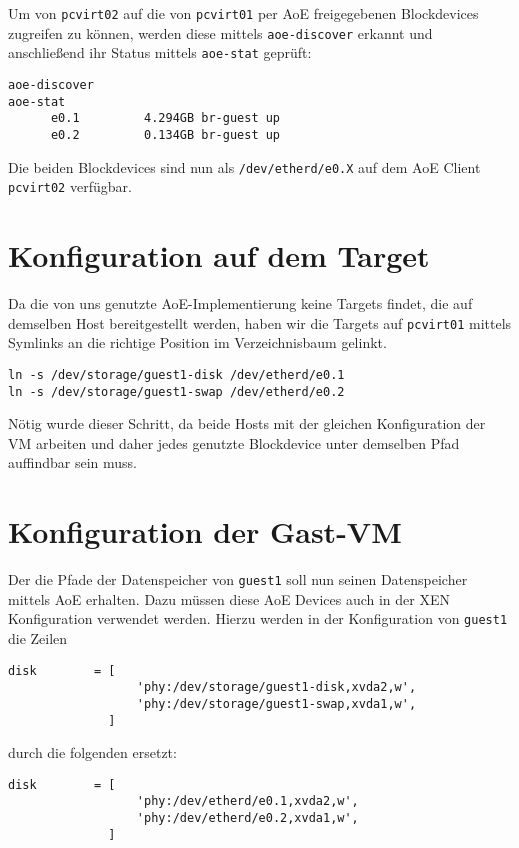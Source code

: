 Um von \verb#pcvirt02# auf die von \verb#pcvirt01# per AoE freigegebenen Blockdevices zugreifen zu können, werden diese mittels \verb#aoe-discover# erkannt und anschließend ihr Status mittels \verb#aoe-stat# geprüft:
\setupVerbatimOut
\begin{verbatim}
aoe-discover 
aoe-stat 
      e0.1         4.294GB br-guest up 
      e0.2         0.134GB br-guest up  
\end{verbatim}

Die beiden Blockdevices sind nun als \verb#/dev/etherd/e0.X# auf dem AoE Client \verb#pcvirt02# verfügbar.

\section{Konfiguration auf dem Target}
Da die von uns genutzte AoE-Implementierung keine Targets findet, die auf demselben Host bereitgestellt werden, haben wir die Targets auf \verb#pcvirt01# mittels Symlinks an die richtige Position im Verzeichnisbaum gelinkt.
\setupVerbatimOut
\begin{verbatim}
ln -s /dev/storage/guest1-disk /dev/etherd/e0.1
ln -s /dev/storage/guest1-swap /dev/etherd/e0.2 
\end{verbatim}

Nötig wurde dieser Schritt, da beide Hosts mit der gleichen Konfiguration der VM arbeiten und daher jedes genutzte Blockdevice unter demselben Pfad auffindbar sein muss.

\section{Konfiguration der Gast-VM }
Der die Pfade der Datenspeicher von \verb#guest1# soll nun seinen Datenspeicher mittels AoE erhalten. Dazu müssen diese AoE Devices auch in der XEN Konfiguration verwendet werden. Hierzu werden in der Konfiguration von \verb#guest1# die Zeilen
\setupVerbatimOut
\begin{verbatim}
disk        = [
                  'phy:/dev/storage/guest1-disk,xvda2,w',
                  'phy:/dev/storage/guest1-swap,xvda1,w',
              ]
\end{verbatim}
durch die folgenden ersetzt:
\setupVerbatimOut
\begin{verbatim}
disk        = [
                  'phy:/dev/etherd/e0.1,xvda2,w',
                  'phy:/dev/etherd/e0.2,xvda1,w',
              ]
\end{verbatim}

